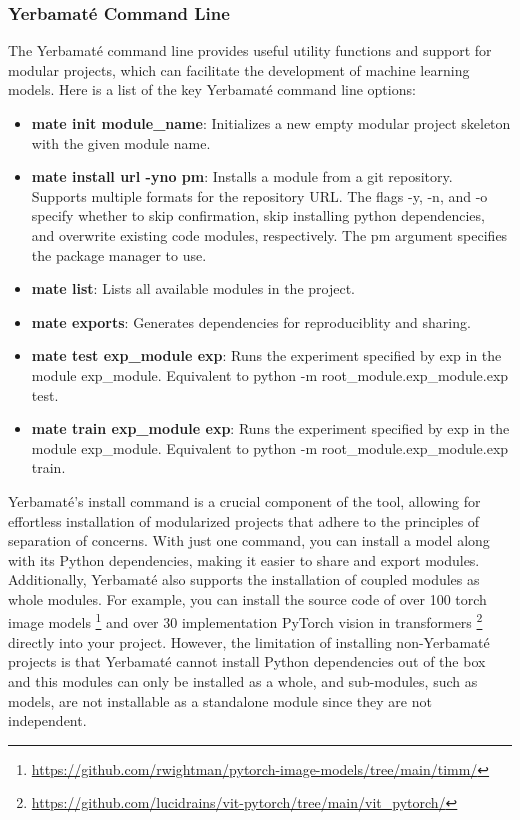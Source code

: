 \documentclass{article}
\begin{document}
\subsubsection{Yerbamaté Command Line}
The Yerbamaté command line provides useful utility functions and support for modular projects, which can facilitate the development of machine learning models.
Here is a list of the key Yerbamaté command line options:

\begin{itemize}
\item \textbf{mate init module\_name}: Initializes a new empty modular project skeleton with the given module name. 

\item \textbf{mate install url -y\textbar n\textbar o pm}: Installs a module from a git repository. Supports multiple formats for the repository URL. The flags -y, -n, and -o specify whether to skip confirmation, skip installing python dependencies, and overwrite existing code modules, respectively. The pm argument specifies the package manager to use.
\item \textbf{mate list}: Lists all available modules in the project. 
\item \textbf{mate exports}: Generates dependencies for reproduciblity and sharing.
\item \textbf{mate test exp\_module exp}: Runs the experiment specified by exp in the module exp\_module. Equivalent to python -m root\_module.exp\_module.exp test.
\item \textbf{mate train exp\_module exp}: Runs the experiment specified by exp in the module exp\_module. Equivalent to python -m root\_module.exp\_module.exp train.
\end{itemize}



Yerbamaté's install command is a crucial component of the tool, allowing for effortless installation of modularized projects that adhere to the principles of separation of concerns. With just one command, you can install a model along with its Python dependencies, making it easier to share and export modules. Additionally, Yerbamaté also supports the installation of coupled modules as whole modules. For example, you can install the source code of over 100 torch image models \footnote{\url{https://github.com/rwightman/pytorch-image-models/tree/main/timm/}} and over 30 implementation PyTorch vision in transformers \footnote{\url{https://github.com/lucidrains/vit-pytorch/tree/main/vit\_pytorch/}} directly into your project. However, the limitation of installing non-Yerbamaté projects is that Yerbamaté cannot install Python dependencies out of the box and this modules can only be installed as a whole, and sub-modules, such as models, are not installable as a standalone module since they are not independent.
\end{document}
